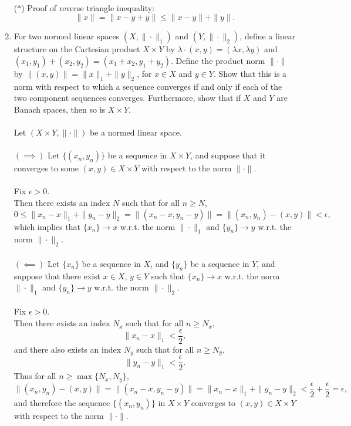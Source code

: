 \begin{enumerate}
    \\($\ast$) Proof of reverse triangle inequality:
    \[
        \|x\|=\|x-y+y\|\le\|x-y\|+\|y\|.
    \]
    \item For two normed linear spaces $(X,\|\cdot\|_1)$ and $(Y,\|\cdot\|_2)$, define a linear structure on the Cartesian product $X\times Y$ by $\lambda\cdot(x,y)=(\lambda x,\lambda y)$ and $(x_1,y_1)+(x_2,y_2)=(x_1+x_2,y_1+y_2)$.
    Define the product norm $\|\cdot\|$ by $\|(x,y)\|=\|x\|_1+\|y\|_2$, for $x\in X$ and $y\in Y$.
    Show that this is a norm with respect to which a sequence converges if and only if each of the two component sequences converges.
    Furthermore, show that if $X$ and $Y$ are Banach spaces, then so is $X\times Y$.\\
    \\Let $(X\times Y,\|\cdot\|)$ be a normed linear space.\\
    \\$(\implies)$ Let $\{(x_n,y_n)\}$ be a sequence in $X\times Y$, and suppose that it converges to some $(x,y)\in X\times Y$ with respect to the norm $\|\cdot\|$.\\
    \\Fix $\epsilon>0$.
    \\Then there exists an index $N$ such that for all $n\ge N$,
    \[
        0\le\|x_n-x\|_1+\|y_n-y\|_2=\|(x_n-x,y_n-y)\|=\|(x_n,y_n)-(x,y)\|<\epsilon,
    \]
    which implies that $\{x_n\}\to x$ w.r.t. the norm $\|\cdot\|_1$ and $\{y_n\}\to y$ w.r.t. the norm $\|\cdot\|_2$.\\
    \\$(\impliedby)$ Let $\{x_n\}$ be a sequence in $X$, and $\{y_n\}$ be a sequence in $Y$, and suppose that there exist $x\in X$, $y\in Y$ such that $\{x_n\}\to x$ w.r.t. the norm $\|\cdot\|_1$ and $\{y_n\}\to y$ w.r.t. the norm $\|\cdot\|_2$.\\
    \\Fix $\epsilon>0$.
    \\Then there exists an index $N_x$ such that for all $n\ge N_x$,
    \[
        \|x_n-x\|_1<\frac{\epsilon}{2},
    \]
    and there also exists an index $N_y$ such that for all $n\ge N_y$,
    \[
        \|y_n-y\|_1<\frac{\epsilon}{2}.
    \]
    Thus for all $n\ge\max\{N_x,N_y\}$,
    \[
        \|(x_n,y_n)-(x,y)\|=\|(x_n-x,y_n-y)\|=\|x_n-x\|_1+\|y_n-y\|_2<\frac{\epsilon}{2}+\frac{\epsilon}{2}=\epsilon,
    \]
    and therefore the sequence $\{(x_n,y_n)\}$ in $X\times Y$ converges to $(x,y)\in X\times Y$ with respect to the norm $\|\cdot\|$.\\

\end{enumerate}
